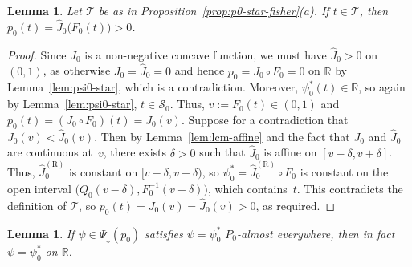 \documentclass[a4paper]{article}
\newcommand{\R}{\mathbb{R}}
\newtheorem{lemma}[theorem]{Lemma}
\theoremstyle{definition}
\begin{document}
\begin{lemma}
\label{lem:J0-J0hat}
Let $\mathcal{T}$ be as in Proposition~\ref{prop:p0-star-fisher}\textit{(a)}. If $t \in \mathcal{T}$, then $p_0(t) = \hat{J}_0\bigl(F_0(t)\bigr) > 0$. 
\end{lemma}

\begin{proof}
Since $\hat{J}_0$ is a non-negative concave function, we must have $\hat{J}_0 > 0$ on $(0,1)$, as otherwise $J_0 = \hat{J}_0 = 0$ and hence $p_0 = J_0 \circ F_0 = 0$ on $\R$ by Lemma~\ref{lem:psi0-star}, which is a contradiction. Moreover, $\psi_0^*(t) \in \R$, so again by Lemma~\ref{lem:psi0-star}, $t \in \mathcal{S}_0$. Thus, $v := F_0(t) \in (0,1)$ and $p_0(t) = (J_0 \circ F_0)(t) = J_0(v)$. Suppose for a contradiction that $J_0(v) < \hat{J}_0(v)$. Then by Lemma~\ref{lem:lcm-affine} and the fact that $J_0$ and $\hat{J}_0$ are continuous at~$v$, there exists $\delta > 0$ such that $\hat{J}_0$ is affine on $[v - \delta, v + \delta]$. Thus, $\hat{J}_0^{(\mathrm{R})}$ is constant on $[v - \delta, v + \delta)$, so $\psi_0^* = \hat{J}_0^{(\mathrm{R})} \circ F_0$ is constant on the open interval $\bigl(Q_0(v - \delta),F_0^{-1}(v + \delta)\bigr)$, which contains~$t$. This contradicts the definition of $\mathcal{T}$, so $p_0(t) = J_0(v) = \hat{J}_0(v) > 0$, as required.
\end{proof}

\begin{lemma}
\label{lem:psi-unique}
If $\psi \in \Psi_\downarrow(p_0)$ satisfies $\psi = \psi_0^*$ $P_0$-almost everywhere, then in fact $\psi = \psi_0^*$ on $\R$.
\end{lemma}
\end{document}
